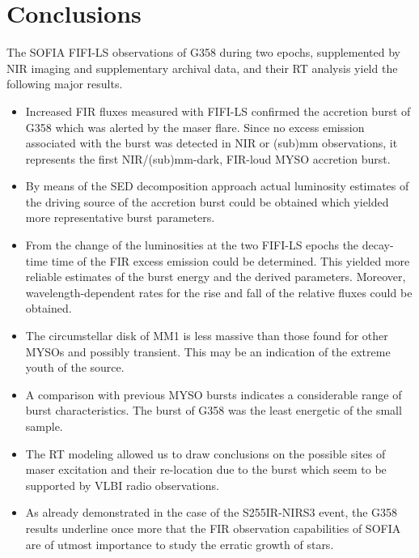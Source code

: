 
\section{Conclusions}\label{conc}

The SOFIA FIFI-LS observations of G358 during two epochs, supplemented by NIR imaging and supplementary archival data, and their RT analysis yield the following major results.
\begin{itemize}
    \item Increased FIR fluxes measured with FIFI-LS confirmed the accretion burst of G358 which was alerted by the maser flare. 
    Since no excess emission associated with the burst was detected in NIR or (sub)mm observations,
    it represents the first NIR/(sub)mm-dark, FIR-loud MYSO accretion burst.
    \item By means of the SED decomposition approach actual luminosity estimates of the driving source of the accretion burst could be obtained which yielded more representative burst parameters.
    \item From the change of the luminosities at the two FIFI-LS epochs the decay-time time of the FIR excess emission could be determined. This yielded more reliable estimates of the burst energy and the derived parameters. Moreover, wavelength-dependent rates for the rise and fall of the relative fluxes could be obtained.
    \item The circumstellar disk of MM1 is less massive than those found for other MYSOs and possibly transient. This may be an indication of the extreme youth of the source.
    \item A comparison with previous MYSO bursts indicates a considerable range of burst characteristics. The burst of G358 was the least energetic of the small sample.
    \item The RT modeling allowed us to draw conclusions on the possible sites of maser excitation and their re-location due to the burst which seem to be supported by VLBI radio observations.
   \item As already demonstrated in the case of the S255IR-NIRS3 event, the G358 results underline once more that the FIR observation capabilities of SOFIA are of utmost importance to study the erratic growth of stars.
 
\end{itemize}



